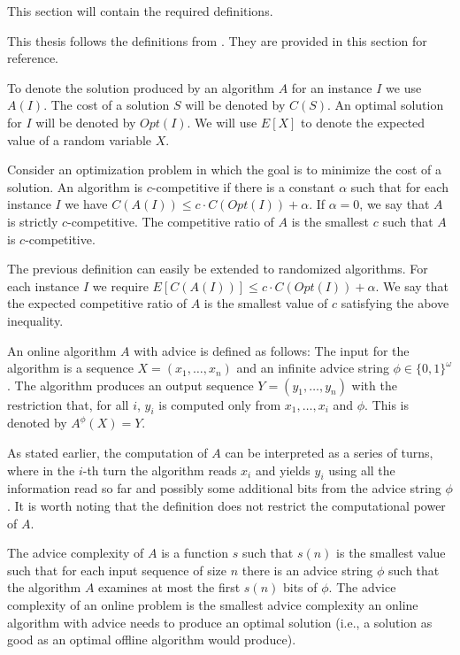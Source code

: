 This section will contain the required definitions. 

This thesis follows the definitions from \cite{misof-trivial-graphs}. They
are provided in this section for reference.

To denote the solution produced by an algorithm $A$ for an instance $I$ we
use $A(I)$. The cost of a solution $S$ will be denoted by $C(S)$. An
optimal solution for $I$ will be denoted by $Opt(I)$. We will use $E[X]$
to denote the expected value of a random variable $X$.

\begin{definition}\label{def:competitive-ratio}
    Consider an optimization problem in which the goal is to minimize the
    cost of a solution. An algorithm is $c$-competitive if there is a
    constant $\alpha$ such that for each instance $I$ we have $C(A(I))
    \leq c \cdot C(Opt(I)) + \alpha$.  If $\alpha = 0$, we say that $A$ is
    strictly $c$-competitive. The competitive ratio of $A$ is the smallest
    $c$ such that $A$ is $c$-competitive.
\end{definition}

The previous definition can easily be extended to randomized algorithms.
For each instance $I$ we require $E[C(A(I))] \leq c \cdot C(Opt(I)) +
\alpha$. We say that the expected competitive ratio of $A$ is the smallest
value of $c$ satisfying the above inequality.

\begin{definition}\label{def:online-advice}
    An online algorithm $A$ with advice is defined as follows: The input
    for the algorithm is a sequence $X = (x_1, \dots, x_n)$ and an
    infinite advice string $\phi \in \{0, 1\}^\omega$. The algorithm
    produces an output sequence $Y = (y_1, \dots, y_n)$ with the
    restriction that, for all $i$, $y_i$ is computed only from $x_1,
    \dots, x_i$ and $\phi$. This is denoted by $A^\phi(X) = Y$.
\end{definition}

As stated earlier, the computation of $A$ can be interpreted as a series
of turns, where in the $i$-th turn the algorithm reads $x_i$ and yields
$y_i$ using all the information read so far and possibly some additional
bits from the advice string $\phi$. It is worth noting that the definition
does not restrict the computational power of $A$.

\begin{definition}\label{def:advice-complexity}
    The advice complexity of $A$ is a function $s$ such that $s(n)$ is the
    smallest value such that for each input sequence of size $n$ there is
    an advice string $\phi$ such that the algorithm $A$ examines at most
    the first $s(n)$ bits of $\phi$. The advice complexity of an online
    problem is the smallest advice complexity an online algorithm with
    advice needs to produce an optimal solution (i.e., a solution as good
    as an optimal offline algorithm would produce).
\end{definition}


